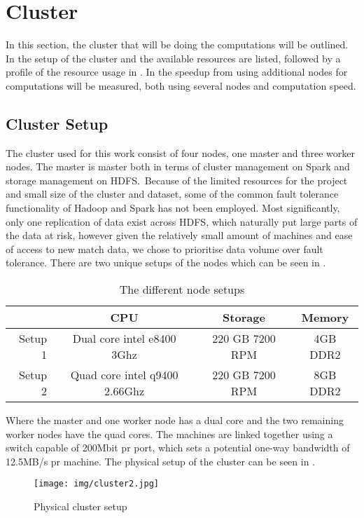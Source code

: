 \section{Cluster}\label{sec:cluster}
In this section, the cluster that will be doing the computations will be outlined. In  the setup of the cluster and the available resources are listed, followed by a profile of the resource usage in . In  the speedup from using additional nodes for computations will be measured, both using several nodes and computation speed.

\subsection{Cluster Setup}\label{sec:clustersetup}

The cluster used for this work consist of four nodes, one master and three worker nodes. The master is master both in terms of cluster management on Spark and storage management on HDFS.\ Because of the limited resources for the project and small size of the cluster and dataset, some of the common fault tolerance functionality of Hadoop and Spark has not been employed. Most significantly, only one replication of data exist across HDFS, which naturally put large parts of the data at risk, however given the relatively small amount of machines and ease of access to new match data, we chose to prioritise data volume over fault tolerance. There are two unique setups of the nodes which can be seen in .
\begin{table}[!htb]
  \centering
  \begin{tabular}{|r|ccc|}
    \hline
      & CPU & Storage & Memory \\\hline
    Setup 1 & Dual core intel e8400 3Ghz & 220 GB 7200 RPM & 4GB DDR2 \\
    Setup 2 & Quad core intel q9400 2.66Ghz & 220 GB 7200 RPM & 8GB DDR2 \\\hline
  \end{tabular}
  \caption{The different node setups}\label{tab:setups}
\end{table}

Where the master and one worker node has a dual core and the two remaining worker nodes have the quad cores. The machines are linked together using a switch capable of 200Mbit pr port, which sets a potential one-way bandwidth of 12.5MB/s pr machine. The physical setup of the cluster can be seen in .

\begin{figure}[!htb]
  \centering
    \texttt{[image: img/cluster2.jpg]}
  \caption{Physical cluster setup}\label{fig:clustersetup}
\end{figure}

